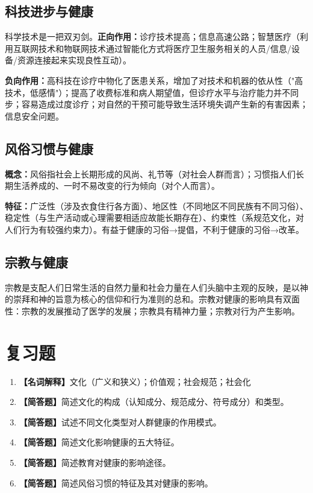 \subsection{科技进步与健康}

\begin{defbox}
科学技术是一把双刃剑。\textbf{正向作用：}诊疗技术提高；信息高速公路；智慧医疗（利用互联网技术和物联网技术通过智能化方式将医疗卫生服务相关的人员/信息/设备/资源连接起来实现良性互动）。

\textbf{负向作用：}高科技在诊疗中物化了医患关系，增加了对技术和机器的依从性（"高技术，低感情"）；提高了收费标准和病人期望值，但诊疗水平与治疗能力并不同步；容易造成过度诊疗；对自然的干预可能导致生活环境失调产生新的有害因素；信息安全问题。
\end{defbox}

\subsection{风俗习惯与健康}

\begin{defbox}
\textbf{概念：}风俗指社会上长期形成的风尚、礼节等（对社会人群而言）；习惯指人们长期生活养成的、一时不易改变的行为倾向（对个人而言）。

\textbf{特征：}广泛性（涉及衣食住行各方面）、地区性（不同地区不同民族有不同习俗）、稳定性（与生产活动或心理需要相适应故能长期存在）、约束性（系规范文化，对人们行为有较强约束力）。有益于健康的习俗→提倡，不利于健康的习俗→改革。
\end{defbox}

\subsection{宗教与健康}

\begin{defbox}
宗教是支配人们日常生活的自然力量和社会力量在人们头脑中主观的反映，是以神的崇拜和神的旨意为核心的信仰和行为准则的总和。宗教对健康的影响具有双面性：宗教的发展推动了医学的发展；宗教具有精神力量；宗教对行为产生影响。
\end{defbox}

\section{复习题}

\begin{enumerate}[leftmargin=*, itemsep=8pt]
    \item \textbf{【名词解释】}文化（广义和狭义）；价值观；社会规范；社会化
    \item \textbf{【简答题】}简述文化的构成（认知成分、规范成分、符号成分）和类型。
    \item \textbf{【简答题】}试述不同文化类型对人群健康的作用模式。
    \item \textbf{【简答题】}简述文化影响健康的五大特征。
    \item \textbf{【简答题】}简述教育对健康的影响途径。
    \item \textbf{【简答题】}简述风俗习惯的特征及其对健康的影响。
\end{enumerate}

